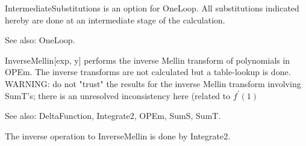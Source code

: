 




IntermediateSubstitutions is an option for OneLoop. All substitutions indicated hereby are done at an intermediate stage of the
  calculation.

See also:  OneLoop.



InverseMellin[exp, y] performs the inverse Mellin transform of polynomials in OPEm. The inverse transforms are not calculated but a
  table-lookup is done. WARNING: do not "trust" the results for the inverse Mellin transform involving SumT's; there is an unresolved
  inconsistency here (related to \({f^{\prime }}(1)\)

See also:  DeltaFunction, Integrate2, OPEm, SumS, SumT.














The inverse operation to InverseMellin is done by Integrate2.

